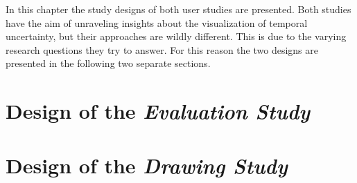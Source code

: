 In this chapter the study designs of both user studies are presented. Both studies have the aim of unraveling insights about the visualization of temporal uncertainty, but their approaches are wildly different. This is due to the varying research questions they try to answer. For this reason the two designs are presented in the following two separate sections. 

\section{Design of the \textit{Evaluation Study}}
\label{ch:evaluationMethod}



\section{Design of the \textit{Drawing Study}}
\label{ch:drawingMethod}
